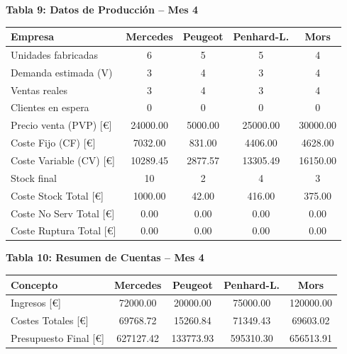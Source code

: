 \documentclass{standalone}
\begin{document}
	\vspace{4em} %
	
	\begin{minipage}{1.08\linewidth}
		\centering
		
		\textbf{Tabla 9: Datos de Producción – Mes 4}\\[0.5em]
		\begin{tabular}{@{}l
				S[table-format=2.0]
				S[table-format=2.0]
				S[table-format=2.0]
				S[table-format=2.0]@{}}
			\toprule
			\textbf{Empresa} & \textbf{Mercedes} & \textbf{Peugeot} & \textbf{Penhard-L.} & \textbf{Mors} \\
			\midrule
			Unidades fabricadas & 6 & 5 & 5 & 4 \\
			Demanda estimada (V) & 3 & 4 & 3 & 4 \\
			Ventas reales & 3 & 4 & 3 & 4 \\
			Clientes en espera & 0 & 0 & 0 & 0 \\
			Precio venta (PVP) [\euro] & 24000.00 & 5000.00 & 25000.00 & 30000.00 \\
			Coste Fijo (CF) [\euro] & 7032.00 & 831.00 & 4406.00 & 4628.00 \\
			Coste Variable (CV) [\euro] & 10289.45 & 2877.57 & 13305.49 & 16150.00 \\
			Stock final & 10 & 2 & 4 & 3 \\
			Coste Stock Total [\euro] & 1000.00 & 42.00 & 416.00 & 375.00 \\
			Coste No Serv Total [\euro] & 0.00 & 0.00 & 0.00 & 0.00 \\
			Coste Ruptura Total [\euro] & 0.00 & 0.00 & 0.00 & 0.00 \\
			\bottomrule
		\end{tabular}
		
		\vspace{2em} %
		
		\textbf{Tabla 10: Resumen de Cuentas – Mes 4}\\[0.5em]
		\begin{tabular}{@{}l
				S[table-format=7.2]
				S[table-format=7.2]
				S[table-format=7.2]
				S[table-format=7.2]@{}}
			\toprule
			\textbf{Concepto} & \textbf{Mercedes} & \textbf{Peugeot} & \textbf{Penhard-L.} & \textbf{Mors} \\
			\midrule
			Ingresos [\euro] & 72000.00 & 20000.00 & 75000.00 & 120000.00 \\
			Costes Totales [\euro] & 69768.72 & 15260.84 & 71349.43 & 69603.02 \\
			Presupuesto Final [\euro] & 627127.42 & 133773.93 & 595310.30 & 656513.91 \\
			\bottomrule
		\end{tabular}
		
	\end{minipage}
	
\end{document}
